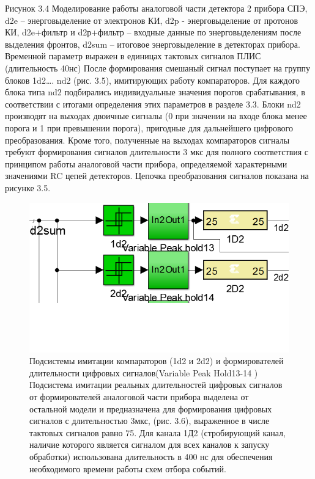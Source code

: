 Рисунок 3.4 Моделирование работы аналоговой части детектора 2 прибора СПЭ, d2e – энерговыделение от электронов КИ, d2p - энерговыделение от протонов КИ, d2e+фильтр и d2р+фильтр – входные данные по энерговыделениям после выделения фронтов,  d2sum – итоговое энерговыделение в детекторах прибора. Временной параметр выражен в единицах тактовых сигналов ПЛИС (длительность 40нс)
После формирования смешаный сигнал поступает на группу блоков 1d2…. nd2 (рис. 3.5), имитирующих работу компараторов. Для каждого блока типа  nd2 подбирались индивидуальные значения порогов срабатывания, в соответствии с итогами определения этих параметров в разделе 3.3. Блоки nd2 производят на выходах двоичные сигналы (0 при значении на входе блока менее порога и 1 при превышении порога), пригодные для дальнейшего цифрового преобразования. Кроме того, полученные на выходах компараторов сигналы требуют формирования сигналов длительности 3 мкс для полного соответствия с принципом работы аналоговой части прибора, определяемой характерными значениями RC цепей детекторов. Цепочка преобразования сигналов показана на рисунке 3.5.

\begin{figure}
\centering
\includegraphics[width=0.7\linewidth]{images/sim_comparators}
\caption{Подсистемы имитации компараторов (1d2 и 2d2) и формирователей длительности цифровых сигналов(Variable Peak Hold13-14 )
	Подсистема имитации реальных длительностей цифровых сигналов от формирователей аналоговой части прибора выделена от остальной модели и предназначена для формирования цифровых сигналов с длительностью 3мкс, (рис. 3.6), выраженное в числе тактовых сигналов равно 75. Для канала 1Д2 (стробирующий канал, наличие которого является сигналом для всех каналов к запуску обработки) использована длительность в 400 нс для обеспечения необходимого времени работы схем отбора событий.}
\label{fig:sim_comparators}
\end{figure}



